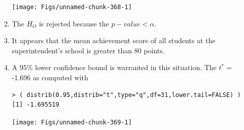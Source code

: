 \documentclass[10pt,openany]{book}\usepackage[]{graphicx}\usepackage[]{color}
\makeatletter
\newenvironment{kframe}{%
 \def\at@end@of@kframe{}%
 \ifinner\ifhmode%
  \def\at@end@of@kframe{\end{minipage}}%
  \begin{minipage}{\columnwidth}%
 \fi\fi%
 \def\FrameCommand##1{\hskip\@totalleftmargin \hskip-\fboxsep
 \colorbox{shadecolor}{##1}\hskip-\fboxsep
     \hskip-\linewidth \hskip-\@totalleftmargin \hskip\columnwidth}%
 \MakeFramed {\advance\hsize-\width
   \@totalleftmargin\z@ \linewidth\hsize
   \@setminipage}}%
 {\par\unskip\endMakeFramed%
 \at@end@of@kframe}
\newenvironment{knitrout}{}{} %
\makeatother
\begin{document}
\begin{itemize}
\begin{enumerate}
\begin{knitrout}
{\centering \texttt{[image: Figs/unnamed-chunk-368-1]} 

}



\end{knitrout}
      \item The $H_{O}$ is rejected because the $p-value<\alpha$.
      \item It appears that the mean achievement score of all students at the superintendent's school is greater than 80 points.
      \item A 95\% lower confidence bound is warranted in this situation.  The $t^{*}=$-1.696 as computed with
\begin{knitrout}
\color{fgcolor}\begin{kframe}
\begin{verbatim}
> ( distrib(0.95,distrib="t",type="q",df=31,lower.tail=FALSE) )
[1] -1.695519
\end{verbatim}
\end{kframe}

{\centering \texttt{[image: Figs/unnamed-chunk-369-1]} 

}




\end{knitrout}
\end{enumerate}
\end{itemize}
\end{document}
